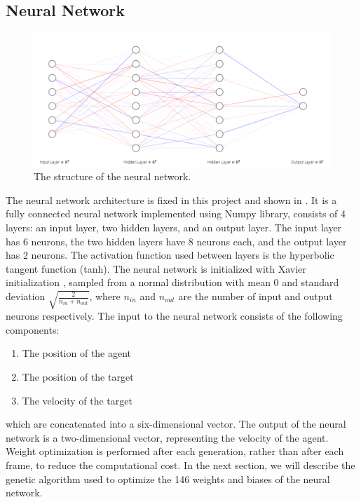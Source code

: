 \documentclass[sigconf]{acmart}
\begin{document}
\subsection{Neural Network}
\begin{figure}[H]
  \centering
  \includegraphics[width=0.9\linewidth]{imgs/NeuralNetwork.png}
  \caption{The structure of the neural network.}
  \label{fig:neural_network}
\end{figure}
The neural network architecture is fixed in this project and shown in . It is a fully connected neural network implemented using Numpy library, consists of 4 layers: an input layer, two hidden layers, and an output layer. The input layer has 6 neurons, the two hidden layers have 8 neurons each, and the output layer has 2 neurons. The activation function used between layers is the hyperbolic tangent function (tanh). The neural network is initialized with Xavier initialization \label{imp_Initialization}\cite{Xavier_pmlr-v9-glorot10a}, sampled from a normal distribution with mean 0 and standard deviation $\sqrt{\frac{2}{n_{in} + n_{out}}}$, where $n_{in}$ and $n_{out}$ are the number of input and output neurons respectively. The input to the neural network consists of the following components:
\begin{enumerate}
  \item The position of the agent
  \item The position of the target
  \item The velocity of the target
\end{enumerate}
which are concatenated into a six-dimensional vector.
The output of the neural network is a two-dimensional vector, representing the velocity of the agent. 
Weight optimization is performed after each generation, rather than after each frame, to reduce the computational cost.
In the next section, we will describe the genetic algorithm used to optimize the 146 weights and biases of the neural network.
\end{document}
